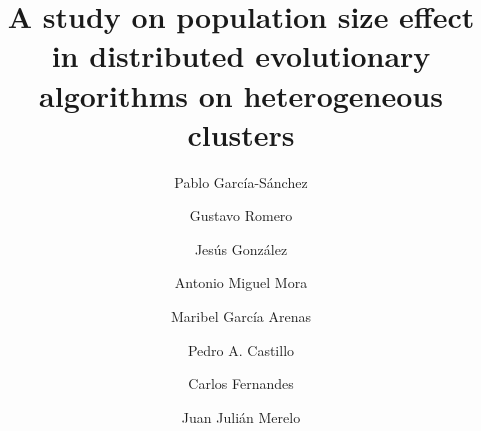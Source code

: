 \documentclass[final,1p,times]{elsarticle}
\begin{document}
\begin{frontmatter}



\title{A study on population size effect in distributed evolutionary algorithms on heterogeneous clusters}


\author[ugr]{Pablo Garc\'ia-S\'anchez}
\author[ugr]{Gustavo Romero}
\author[ugr]{Jes\'us Gonz\'alez}
\author[ugr]{Antonio Miguel Mora}
\author[ugr]{Maribel Garc\'ia Arenas}
\author[ugr]{Pedro A. Castillo}
\author[laseeb]{Carlos Fernandes}
\author[ugr]{Juan Juli\'an Merelo}


\address[ugr]{Department of Computer Architecture and Computer Technology and CITIC-UGR, University of Granada, Granada, Spain. Tel: +34958241778. Fax: +34958248993}
\address[laseeb]{LaSEEB-ISR-IST, Technical University of Lisbon (IST), Lisbon, Portugal}%



\end{frontmatter}
\end{document}
